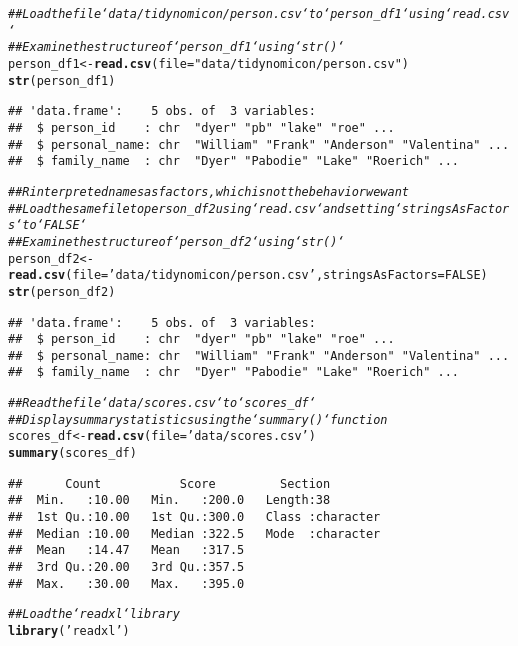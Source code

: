 \documentclass{article}\usepackage[]{graphicx}\usepackage[]{xcolor}
\makeatletter
\newcommand{\hlnum}[1]{\textcolor[rgb]{0.686,0.059,0.569}{#1}}%
\newcommand{\hlstr}[1]{\textcolor[rgb]{0.192,0.494,0.8}{#1}}%
\newcommand{\hlcom}[1]{\textcolor[rgb]{0.678,0.584,0.686}{\textit{#1}}}%
\newcommand{\hlstd}[1]{\textcolor[rgb]{0.345,0.345,0.345}{#1}}%
\newcommand{\hlkwb}[1]{\textcolor[rgb]{0.69,0.353,0.396}{#1}}%
\newcommand{\hlkwc}[1]{\textcolor[rgb]{0.333,0.667,0.333}{#1}}%
\newcommand{\hlkwd}[1]{\textcolor[rgb]{0.737,0.353,0.396}{\textbf{#1}}}%
\newenvironment{kframe}{%
 \def\at@end@of@kframe{}%
 \ifinner\ifhmode%
  \def\at@end@of@kframe{\end{minipage}}%
  \begin{minipage}{\columnwidth}%
 \fi\fi%
 \def\FrameCommand##1{\hskip\@totalleftmargin \hskip-\fboxsep
 \colorbox{shadecolor}{##1}\hskip-\fboxsep
     \hskip-\linewidth \hskip-\@totalleftmargin \hskip\columnwidth}%
 \MakeFramed {\advance\hsize-\width
   \@totalleftmargin\z@ \linewidth\hsize
   \@setminipage}}%
 {\par\unskip\endMakeFramed%
 \at@end@of@kframe}
\newenvironment{knitrout}{}{} %
\makeatother
\begin{document}
\begin{knitrout}
\begin{kframe}
\begin{alltt}
\hlcom{## Load the file `data/tidynomicon/person.csv` to `person_df1` using `read.csv`}
\hlcom{## Examine the structure of `person_df1` using `str()`}
\hlstd{person_df1} \hlkwb{<-} \hlkwd{read.csv}\hlstd{(}\hlkwc{file}\hlstd{=}\hlstr{"data/tidynomicon/person.csv"}\hlstd{)}
\hlkwd{str}\hlstd{(person_df1)}
\end{alltt}
\begin{verbatim}
## 'data.frame':	5 obs. of  3 variables:
##  $ person_id    : chr  "dyer" "pb" "lake" "roe" ...
##  $ personal_name: chr  "William" "Frank" "Anderson" "Valentina" ...
##  $ family_name  : chr  "Dyer" "Pabodie" "Lake" "Roerich" ...
\end{verbatim}
\begin{alltt}
\hlcom{## R interpreted names as factors, which is not the behavior we want}
\hlcom{## Load the same file to person_df2 using `read.csv` and setting `stringsAsFactors` to `FALSE`}
\hlcom{## Examine the structure of `person_df2` using `str()`}
\hlstd{person_df2} \hlkwb{<-} \hlkwd{read.csv}\hlstd{(}\hlkwc{file}\hlstd{=}\hlstr{'data/tidynomicon/person.csv'}\hlstd{,} \hlkwc{stringsAsFactors} \hlstd{=} \hlnum{FALSE}\hlstd{)}
\hlkwd{str}\hlstd{(person_df2)}
\end{alltt}
\begin{verbatim}
## 'data.frame':	5 obs. of  3 variables:
##  $ person_id    : chr  "dyer" "pb" "lake" "roe" ...
##  $ personal_name: chr  "William" "Frank" "Anderson" "Valentina" ...
##  $ family_name  : chr  "Dyer" "Pabodie" "Lake" "Roerich" ...
\end{verbatim}
\begin{alltt}
\hlcom{## Read the file `data/scores.csv` to `scores_df`}
\hlcom{## Display summary statistics using the `summary()` function}
\hlstd{scores_df} \hlkwb{<-} \hlkwd{read.csv}\hlstd{(}\hlkwc{file}\hlstd{=}\hlstr{'data/scores.csv'}\hlstd{)}
\hlkwd{summary}\hlstd{(scores_df)}
\end{alltt}
\begin{verbatim}
##      Count           Score         Section         
##  Min.   :10.00   Min.   :200.0   Length:38         
##  1st Qu.:10.00   1st Qu.:300.0   Class :character  
##  Median :10.00   Median :322.5   Mode  :character  
##  Mean   :14.47   Mean   :317.5                     
##  3rd Qu.:20.00   3rd Qu.:357.5                     
##  Max.   :30.00   Max.   :395.0
\end{verbatim}
\begin{alltt}
\hlcom{## Load the `readxl` library}
\hlkwd{library}\hlstd{(}\hlstr{'readxl'}\hlstd{)}


\end{alltt}
\end{kframe}
\end{knitrout}
\end{document}
